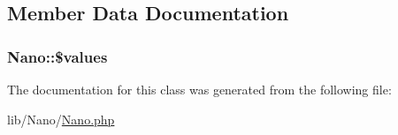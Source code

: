 \subsection{Member Data Documentation}
\hypertarget{classNano_76e01b9737296404395374307ed1edf5}{
\subsubsection[{\$values}]{\setlength{\rightskip}{0pt plus 5cm}Nano::\$values}}
\label{classNano_76e01b9737296404395374307ed1edf5}




The documentation for this class was generated from the following file:\begin{CompactItemize}
\item 
lib/Nano/\hyperlink{Nano_8php}{Nano.php}\end{CompactItemize}
